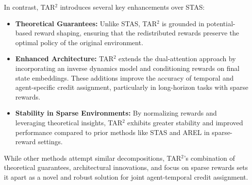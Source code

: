 In contrast, TAR\(^{2}\) introduces several key enhancements over STAS:
\begin{itemize}
    \item \textbf{Theoretical Guarantees:} Unlike STAS, TAR\(^{2}\) is grounded in potential-based reward shaping, ensuring that the redistributed rewards preserve the optimal policy of the original environment.
    \item \textbf{Enhanced Architecture:} TAR\(^{2}\) extends the dual-attention approach by incorporating an inverse dynamics model and conditioning rewards on final state embeddings. These additions improve the accuracy of temporal and agent-specific credit assignment, particularly in long-horizon tasks with sparse rewards.
    \item \textbf{Stability in Sparse Environments:} By normalizing rewards and leveraging theoretical insights, TAR\(^{2}\) exhibits greater stability and improved performance compared to prior methods like STAS and AREL in sparse-reward settings.
\end{itemize}

While other methods attempt similar decompositions, TAR\(^{2}\)’s combination of theoretical guarantees, architectural innovations, and focus on sparse rewards sets it apart as a novel and robust solution for joint agent-temporal credit assignment.